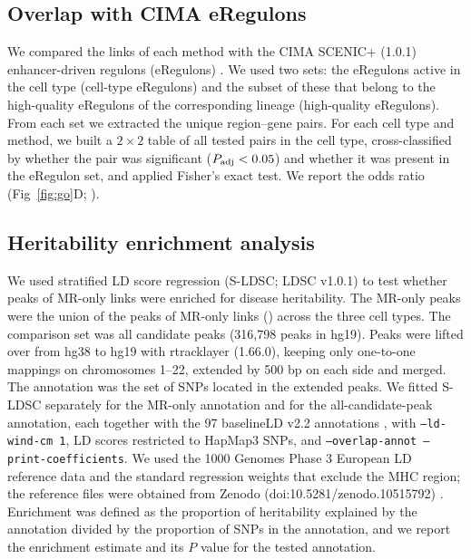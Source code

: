 \subsection{Overlap with CIMA eRegulons}
\label{sec:grn}
We compared the links of each method with the CIMA SCENIC+ (1.0.1) enhancer-driven regulons (eRegulons) \cite{yin2026cima,bravo2023scenicplus}. We used two sets: the eRegulons active in the cell type (cell-type eRegulons) and the subset of these that belong to the high-quality eRegulons of the corresponding lineage (high-quality eRegulons). From each set we extracted the unique region--gene pairs. For each cell type and method, we built a $2\times2$ table of all tested pairs in the cell type, cross-classified by whether the pair was significant ($P_{\mathrm{adj}}<0.05$) and whether it was present in the eRegulon set, and applied Fisher's exact test. We report the odds ratio (Fig~\ref{fig:go}D; ).


\subsection{Heritability enrichment analysis}
\label{sec:sldsc}
We used stratified LD score regression (S-LDSC; LDSC v1.0.1) \cite{finucane2015sldsc} to test whether peaks of MR-only links were enriched for disease heritability. The MR-only peaks were the union of the peaks of MR-only links () across the three cell types. The comparison set was all candidate peaks (316,798 peaks in hg19). Peaks were lifted over from hg38 to hg19 with rtracklayer (1.66.0), keeping only one-to-one mappings on chromosomes 1--22, extended by 500 bp on each side and merged. The annotation was the set of SNPs located in the extended peaks. We fitted S-LDSC separately for the MR-only annotation and for the all-candidate-peak annotation, each together with the 97 baselineLD v2.2 annotations \cite{gazal2017baselineld}, with \texttt{--ld-wind-cm 1}, LD scores restricted to HapMap3 SNPs, and \texttt{--overlap-annot --print-coefficients}. We used the 1000 Genomes Phase 3 European LD reference data and the standard regression weights that exclude the MHC region; the reference files were obtained from Zenodo (doi:10.5281/zenodo.10515792) \cite{gazal2024sldscref}. Enrichment was defined as the proportion of heritability explained by the annotation divided by the proportion of SNPs in the annotation, and we report the enrichment estimate and its $P$ value for the tested annotation.

